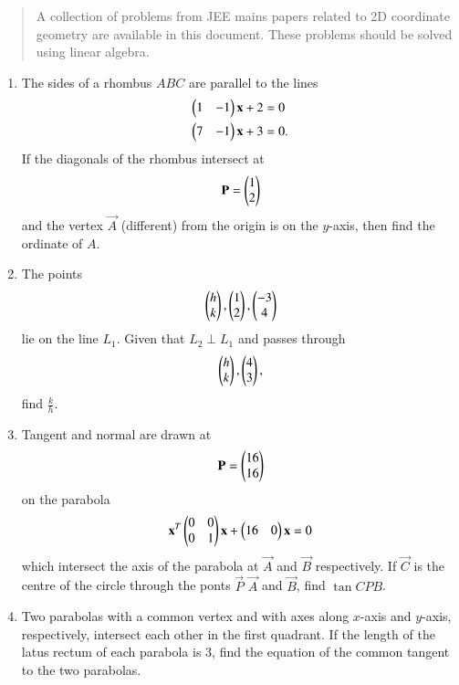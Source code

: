 \documentclass[journal,12pt,twocolumn]{IEEEtran}
\begin{document}
\begin{abstract}
	A  collection of problems from JEE mains papers related to 2D coordinate geometry are 
available in this document.  These problems should be solved using linear algebra.
\end{abstract}
\begin{enumerate}[label=\arabic*.]
\item The sides of a rhombus $ABC$ are parallel to the lines
\begin{align}
\begin{pmatrix}1 & -1\end{pmatrix}\mathbf{x} + 2 &=0
\\
\begin{pmatrix}7 & -1\end{pmatrix}\mathbf{x} + 3 &=0.
\end{align}
If the diagonals of the rhombus intersect at
\begin{align}
\mathbf{P} = \begin{pmatrix}1 \\ 2\end{pmatrix}
\end{align}
and the vertex $\vec{A}$ (different) from the origin is on the $y$-axis, then find the ordinate of $A$.
\item The points 
%
\begin{align}
\begin{pmatrix}h \\ k\end{pmatrix},\begin{pmatrix}1 \\ 2\end{pmatrix},\begin{pmatrix}-3 \\ 4\end{pmatrix}
\end{align}
%
lie on the line $L_1$. Given that $L_2 \perp L_1$ and passes through 
\begin{align}
\begin{pmatrix}h \\ k\end{pmatrix},\begin{pmatrix}4 \\ 3\end{pmatrix},
\end{align}
find $\frac{k}{h}$.
\item Tangent and normal are drawn at 
\begin{equation}
\mathbf{P}= \begin{pmatrix}16 \\ 16\end{pmatrix}
\end{equation}
on the parabola 
\begin{equation}
\mathbf{x}^T\begin{pmatrix}0 & 0 \\ 0 & 1\end{pmatrix}\mathbf{x} + \begin{pmatrix}16 & 0\end{pmatrix}\mathbf{x} =0
\end{equation}
%
which intersect the axis of the parabola at $\vec{A}$ and $\vec{B}$ respectively.  If $\vec{C}$ is the centre 
of the circle through the ponts $\vec{P}$ $\vec{A}$ and $\vec{B}$, find $\tan  CPB$.
%
\item Two parabolas with a common vertex and with axes along $x$-axis and $y$-axis, respectively, intersect 
each other in the first quadrant.  If the length of the latus rectum of each parabola is 3, find the equation 
of the common tangent to the two parabolas.

\end{enumerate}
\end{document}
